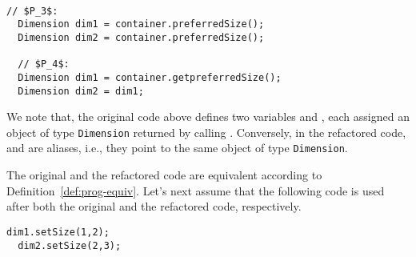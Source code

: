 \documentclass[sigconf,review,anonymous]{acmart}
\begin{document}
\begin{example}\label{ex:aliasing}
~\begin{lstlisting}[mathescape=true,showstringspaces=false]
  // $P_3$:
  Dimension dim1 = container.preferredSize();
  Dimension dim2 = container.preferredSize();    

  // $P_4$:
  Dimension dim1 = container.getpreferredSize();  
  Dimension dim2 = dim1;
\end{lstlisting}



    




We note that, the original code above defines two variables  and
, each assigned an object of type \texttt{Dimension} returned by calling
.
Conversely, in the refactored code,  and  are aliases,
i.e., they point to the same
object of type \texttt{Dimension}.

The original and the refactored code are equivalent according to Definition~\ref{def:prog-equiv}.
Let's next assume that the following code
is used after both the original and the refactored code, respectively.

\begin{lstlisting}[mathescape=true,showstringspaces=false]
  dim1.setSize(1,2);
  dim2.setSize(2,3);  
\end{lstlisting}


\end{example}
\end{document}
